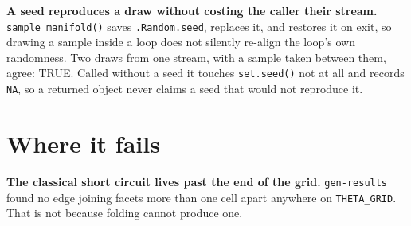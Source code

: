 \documentclass[
  british,
  a4paper,
]{book}
\newenvironment{Shaded}{\begin{snugshade}}{\end{snugshade}}
\newcommand{\AttributeTok}[1]{\textcolor[rgb]{0.13,0.29,0.53}{#1}}
\newcommand{\ControlFlowTok}[1]{\textcolor[rgb]{0.13,0.29,0.53}{\textbf{#1}}}
\newcommand{\DataTypeTok}[1]{\textcolor[rgb]{0.13,0.29,0.53}{#1}}
\newcommand{\DecValTok}[1]{\textcolor[rgb]{0.00,0.00,0.81}{#1}}
\newcommand{\FloatTok}[1]{\textcolor[rgb]{0.00,0.00,0.81}{#1}}
\newcommand{\FunctionTok}[1]{\textcolor[rgb]{0.13,0.29,0.53}{\textbf{#1}}}
\newcommand{\NormalTok}[1]{#1}
\newcommand{\OtherTok}[1]{\textcolor[rgb]{0.56,0.35,0.01}{#1}}
\newcommand{\SpecialCharTok}[1]{\textcolor[rgb]{0.81,0.36,0.00}{\textbf{#1}}}
\begin{document}
\textbf{A seed reproduces a draw without costing the caller their stream.}
\texttt{sample\_manifold()} saves \texttt{.Random.seed}, replaces it, and restores it on exit,
so drawing a sample inside a loop does not silently re-align the loop's own
randomness. Two draws from one stream, with a sample taken between them, agree:
TRUE. Called without a seed it touches \texttt{set.seed()}
not at all and records \texttt{NA}, so a returned object never claims a seed that would
not reproduce it.

\section{Where it fails}\label{gen-limits}

\textbf{The classical short circuit lives past the end of the grid.} \texttt{gen-results}
found no edge joining facets more than one cell apart anywhere on \texttt{THETA\_GRID}.
That is not because folding cannot produce one.

\begin{Shaded}
\end{Shaded}
\end{document}
